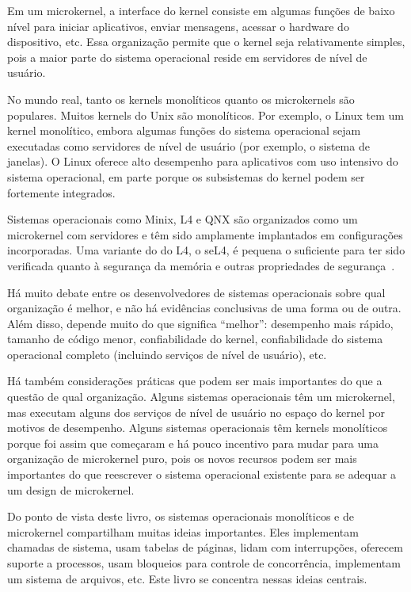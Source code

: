 Em um microkernel, a interface do kernel consiste em algumas funções de baixo nível
para iniciar aplicativos, enviar mensagens,
acessar o hardware do dispositivo, etc.  Essa organização permite que o kernel seja 
relativamente simples, pois a maior parte do sistema operacional
reside em servidores de nível de usuário.

No mundo real, tanto os kernels monolíticos quanto os microkernels são
populares. Muitos kernels do Unix são monolíticos. 
Por exemplo, o Linux tem um kernel monolítico,
embora algumas funções do sistema operacional sejam executadas como servidores de nível de usuário (por exemplo, o sistema de janelas).
O Linux oferece alto desempenho para aplicativos com uso intensivo do sistema operacional, em parte porque os subsistemas do kernel podem ser fortemente integrados.

Sistemas operacionais como Minix, L4 e QNX são organizados como um microkernel com servidores
e têm sido amplamente implantados em configurações incorporadas. Uma variante do
do L4, o seL4, é pequena o suficiente para ter sido verificada quanto à segurança da memória
e outras propriedades de segurança~\cite{sel4}.

Há muito debate entre os desenvolvedores de sistemas operacionais sobre qual
organização é melhor, e não há evidências conclusivas de uma forma ou
de outra.  Além disso, depende muito do que significa “melhor”:
desempenho mais rápido, tamanho de código menor, confiabilidade do kernel,
confiabilidade do sistema operacional completo (incluindo serviços de nível de usuário), etc.

Há também considerações práticas que podem ser mais importantes
do que a questão de qual organização.  Alguns sistemas operacionais
têm um microkernel, mas executam alguns dos serviços de nível de usuário no espaço do kernel
por motivos de desempenho. Alguns sistemas operacionais têm kernels
monolíticos porque foi assim que começaram e há pouco incentivo
para mudar para uma organização de microkernel puro, pois os novos recursos podem
ser mais importantes do que reescrever o sistema operacional existente para se adequar a um design de microkernel.

Do ponto de vista deste livro, os sistemas operacionais monolíticos e de microkernel
compartilham muitas ideias importantes.  Eles implementam chamadas de sistema, usam
tabelas de páginas, lidam com interrupções, oferecem suporte a processos, usam
bloqueios para controle de concorrência, implementam um sistema de arquivos,
etc. Este livro se concentra nessas ideias centrais.

